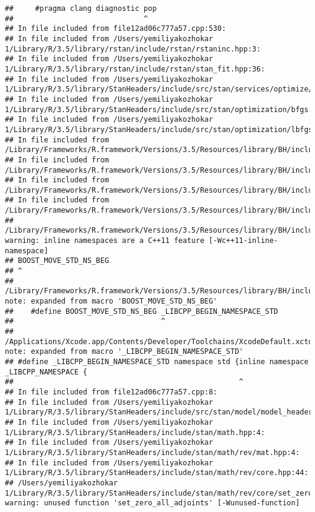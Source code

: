 \documentclass[]{article}
\begin{document}
\begin{verbatim}
##     #pragma clang diagnostic pop
##                              ^
## In file included from file12ad06c777a57.cpp:530:
## In file included from /Users/yemiliyakozhokar 1/Library/R/3.5/library/rstan/include/rstan/rstaninc.hpp:3:
## In file included from /Users/yemiliyakozhokar 1/Library/R/3.5/library/rstan/include/rstan/stan_fit.hpp:36:
## In file included from /Users/yemiliyakozhokar 1/Library/R/3.5/library/StanHeaders/include/src/stan/services/optimize/bfgs.hpp:11:
## In file included from /Users/yemiliyakozhokar 1/Library/R/3.5/library/StanHeaders/include/src/stan/optimization/bfgs.hpp:9:
## In file included from /Users/yemiliyakozhokar 1/Library/R/3.5/library/StanHeaders/include/src/stan/optimization/lbfgs_update.hpp:6:
## In file included from /Library/Frameworks/R.framework/Versions/3.5/Resources/library/BH/include/boost/circular_buffer.hpp:54:
## In file included from /Library/Frameworks/R.framework/Versions/3.5/Resources/library/BH/include/boost/circular_buffer/details.hpp:20:
## In file included from /Library/Frameworks/R.framework/Versions/3.5/Resources/library/BH/include/boost/move/move.hpp:30:
## In file included from /Library/Frameworks/R.framework/Versions/3.5/Resources/library/BH/include/boost/move/iterator.hpp:27:
## /Library/Frameworks/R.framework/Versions/3.5/Resources/library/BH/include/boost/move/detail/iterator_traits.hpp:29:1: warning: inline namespaces are a C++11 feature [-Wc++11-inline-namespace]
## BOOST_MOVE_STD_NS_BEG
## ^
## /Library/Frameworks/R.framework/Versions/3.5/Resources/library/BH/include/boost/move/detail/std_ns_begin.hpp:18:34: note: expanded from macro 'BOOST_MOVE_STD_NS_BEG'
##    #define BOOST_MOVE_STD_NS_BEG _LIBCPP_BEGIN_NAMESPACE_STD
##                                  ^
## /Applications/Xcode.app/Contents/Developer/Toolchains/XcodeDefault.xctoolchain/usr/include/c++/v1/__config:390:52: note: expanded from macro '_LIBCPP_BEGIN_NAMESPACE_STD'
## #define _LIBCPP_BEGIN_NAMESPACE_STD namespace std {inline namespace _LIBCPP_NAMESPACE {
##                                                    ^
## In file included from file12ad06c777a57.cpp:8:
## In file included from /Users/yemiliyakozhokar 1/Library/R/3.5/library/StanHeaders/include/src/stan/model/model_header.hpp:4:
## In file included from /Users/yemiliyakozhokar 1/Library/R/3.5/library/StanHeaders/include/stan/math.hpp:4:
## In file included from /Users/yemiliyakozhokar 1/Library/R/3.5/library/StanHeaders/include/stan/math/rev/mat.hpp:4:
## In file included from /Users/yemiliyakozhokar 1/Library/R/3.5/library/StanHeaders/include/stan/math/rev/core.hpp:44:
## /Users/yemiliyakozhokar 1/Library/R/3.5/library/StanHeaders/include/stan/math/rev/core/set_zero_all_adjoints.hpp:14:17: warning: unused function 'set_zero_all_adjoints' [-Wunused-function]

\end{verbatim}
\end{document}

